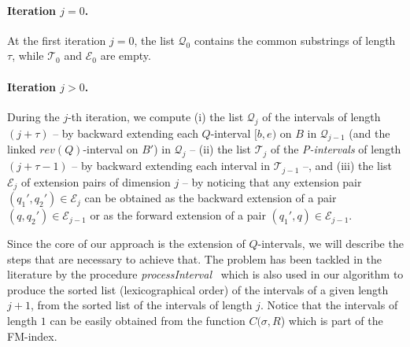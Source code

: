 \documentclass[runningheads,envcountsame,a4paper]{llncs}
\begin{document}
\paragraph{Iteration $j = 0$.}

At the first iteration $j=0$, the list $\mathcal{Q}_0$ contains the
common substrings of length $\tau$, while  $\mathcal{T}_0$ and $\mathcal{E}_0$ are empty.

\paragraph{Iteration $j > 0$.}
During the $j$-th iteration, we compute
(i) the list $\mathcal{Q}_{j}$ of the
intervals of length $(j+\tau)$  -- by backward extending each $Q$-interval $[b, e)$ on $B$ in $\mathcal{Q}_{j-1}$ (and the
linked $rev(Q)$-interval on $B'$) in $\mathcal{Q}_j$  --
(ii) the list $\mathcal{T}_{j}$ of the
\emph{P-intervals} of length $(j+\tau-1)$ -- by backward extending each interval
in $\mathcal{T}_{j-1}$   --, and
(iii) the list $\mathcal{E}_j$ of
extension pairs of dimension $j$ -- by noticing that any extension pair
$(q_{1}',q_{2}')\in \mathcal{E}_j$
can be obtained as the backward extension of a pair
$(q,q_{2}')\in \mathcal{E}_{j-1}$ or as the forward extension of a pair
$(q_{1}',q)\in \mathcal{E}_{j-1}$.



Since the core of our approach is the extension of $Q$-intervals, we will
describe the steps that are necessary to achieve that.
The problem has been tackled in the literature by
the procedure \emph{processInterval}~\cite{Cox2012} which is also used in our algorithm to produce the sorted list
(lexicographical order) of the intervals of a given length $j+1$, from the
sorted list of the intervals of length $j$. Notice that the intervals of length $1$
can be easily obtained from the  function $C(\sigma, R$) which is part of the FM-index.
\end{document}
